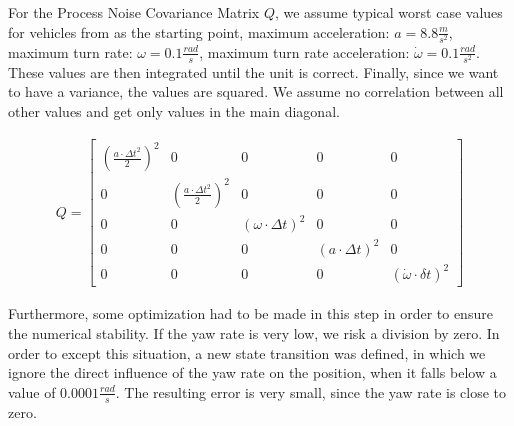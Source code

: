 \documentclass[11pt,oneside,openright]{mpreport}
\begin{document}

For the Process Noise Covariance Matrix $Q$, we assume typical worst case values for vehicles from \cite{Kelly1994} as the starting point,
maximum acceleration: $a = 8.8 \frac{m}{s^2}$, maximum turn rate: $\omega = 0.1 \frac{rad}{s}$,   maximum turn rate acceleration: $\dot\omega = 0.1 \frac{rad}{s^2}$.
These values are then integrated until the unit is correct. Finally, since we want to have a variance, the values are squared. 
We assume no correlation between all other values and get only values in the main diagonal.

\begin{align*}
Q=
\begin{bmatrix}
(\frac{a \cdot \Delta t^2}{2})^2 & 0 & 0 & 0 & 0\\
0 & (\frac{a \cdot \Delta t^2}{2})^2 & 0 & 0 & 0\\
0 & 0 & (\omega \cdot \Delta t)^2 & 0 & 0\\
0 & 0 & 0 & (a \cdot \Delta t)^2 & 0\\
0 & 0 & 0 & 0 & (\dot\omega \cdot \delta t)^2
\end{bmatrix} 
\end{align*}

% 

Furthermore, some optimization had to be made in this step in order to ensure the numerical stability. 
If the yaw rate is very low, we risk a division by zero. In order to except this situation, a new state transition was defined,
in which we ignore the direct influence of the yaw rate on the position, when it falls below a value of $0.0001\frac{rad}{s}$. 
The resulting error is very small, since the yaw rate is close to zero.
\end{document}
